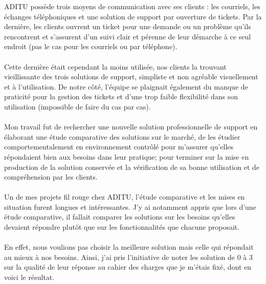 \begin{sloppypar}
ADITU possède trois moyens de communication avec ses clients : les courriels, les échanges téléphoniques et une solution de support par ouverture de tickets. Par la dernière, les clients ouvrent un ticket pour une demande ou un problème qu'ils rencontrent et s'assurent d'un suivi clair et pérenne de leur démarche à ce seul endroit (pas le cas pour les courriels ou par téléphone).
\\ \\
Cette dernière était cependant la moins utilisée, nos clients la trouvant vieillissante des trois solutions de support, simpliste et non agréable visuellement et à l’utilisation. De notre côté, l'équipe se plaignait également du manque de praticité pour la gestion des tickets et d’une trop faible flexibilité dans son utilisation (impossible de faire du cas par cas).
\\ \\
Mon travail fut de rechercher une nouvelle solution professionnelle de support en élaborant une étude comparative des solutions sur le marché, de les étudier comportementalement en environnement contrôlé pour m'assurer qu'elles répondaient bien aux besoins dans leur pratique; pour terminer sur la mise en production de la solution conservée et la vérification de sa bonne utilisation et de compréhension par les clients.
\\ \\
Un de mes projets fil rouge chez ADITU, l'étude comparative et les mises en situation furent longues et intéressantes. J'y ai notamment appris que lors d'une étude comparative, il fallait comparer les solutions sur les besoins qu'elles devaient répondre plutôt que sur les fonctionnalités que chacune proposait.
\\ \\
En effet, nous voulions pas choisir la meilleure solution mais celle qui répondait au mieux à nos besoins. Ainsi, j'ai pris l'initiative de noter les solution de 0 à 3 sur la qualité de leur réponse au cahier des charges que je m'étais fixé, dont en voici le résultat.


\end{sloppypar}
